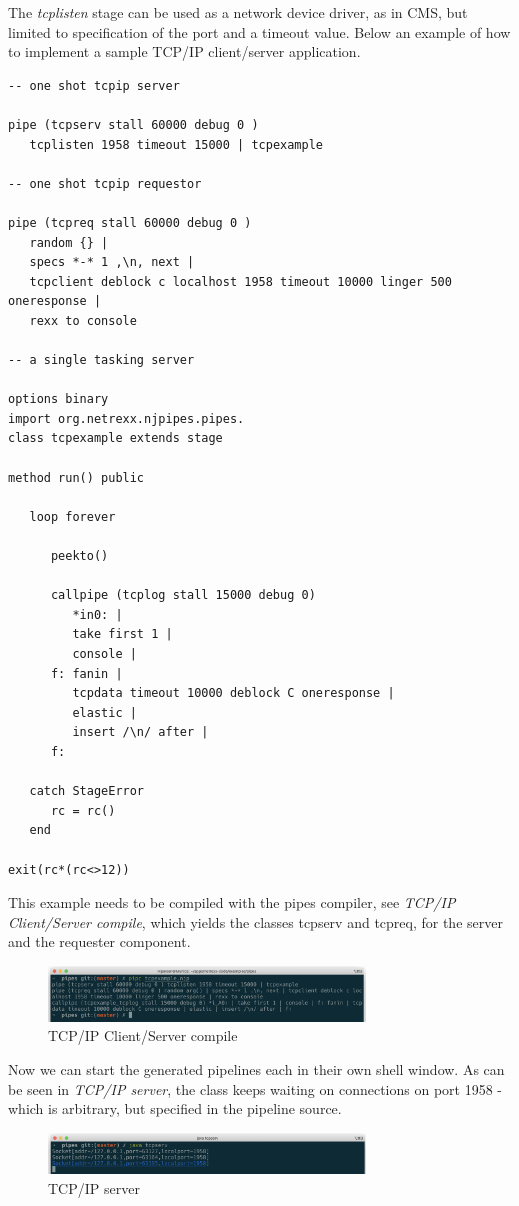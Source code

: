 The \emph{tcplisten} stage can be used as a network device driver, as
in CMS, but limited to specification of the port and a timeout value. Below an example of how to implement a sample TCP/IP
client/server application.
\begin{lstlisting}
-- one shot tcpip server

pipe (tcpserv stall 60000 debug 0 )
   tcplisten 1958 timeout 15000 | tcpexample

-- one shot tcpip requestor

pipe (tcpreq stall 60000 debug 0 )
   random {} |
   specs *-* 1 ,\n, next |
   tcpclient deblock c localhost 1958 timeout 10000 linger 500 oneresponse |
   rexx to console

-- a single tasking server

options binary
import org.netrexx.njpipes.pipes.
class tcpexample extends stage

method run() public

   loop forever

      peekto()

      callpipe (tcplog stall 15000 debug 0)
         *in0: |
         take first 1 |
         console |
      f: fanin |
         tcpdata timeout 10000 deblock C oneresponse |
         elastic |
         insert /\n/ after |
      f:

   catch StageError
      rc = rc()
   end

exit(rc*(rc<>12))
\end{lstlisting}
This example needs to be compiled with the pipes compiler, see
\emph{TCP/IP Client/Server compile}, which yields the classes tcpserv
and tcpreq, for the server and the requester component. 
\begin{figure}[h]
  \includegraphics[width=0.75\textwidth]{images/tcpcompile}
  \caption{TCP/IP Client/Server compile}
  \label{fig:tcpcompile}
\end{figure}

Now we can start the generated pipelines each in their own shell
window. As can be seen in \emph{TCP/IP server}, the class keeps
waiting on connections on port 1958 - which is arbitrary, but
specified in the pipeline source.

\begin{figure}[h]
  \includegraphics[width=0.75\textwidth]{images/tcpserv}
  \caption{TCP/IP server}
  \label{fig:tcpcompile}
\end{figure}

